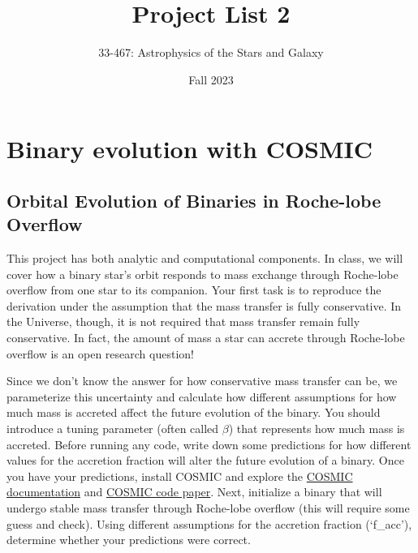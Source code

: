 \documentclass[10pt]{extarticle}
\title{Project List 2}
\author{33-467: Astrophysics of the Stars and Galaxy}
\date{Fall 2023}
\begin{document}
\maketitle


\begin{tcolorbox}[enhanced,
    fonttitle=\fontsize{20}{24}\sffamily\bfseries\selectfont, coltitle=black,
    fontupper=\sffamily, interior style={left color=tcol_CNT1!80,right
    color=tcol_CNT2!80}, frame style={left color=tcol_CNT1!60!black,right
    color=tcol_CNT2!60!black}, attach boxed title to top center={yshift=10pt},
    boxed title style={frame hidden, interior style={left color=tcol_CNT1,right
    color=tcol_CNT2}, frame style={left color=tcol_CNT1!60!black,right
    color=tcol_CNT2!60!black}, height=24pt,bean arc,drop fuzzy shadow },
    top=2mm,bottom=2mm,left=2mm,right=2mm, before skip=20mm,after skip=20mm,
    drop fuzzy shadow,breakable]
%
\makeatletter
{}
\makeatother
\end{tcolorbox}

\section{Binary evolution with COSMIC}

\subsection{Orbital Evolution of Binaries in Roche-lobe Overflow}
This project has both analytic and computational components. In class, we will
cover how a binary star's orbit responds to mass exchange through Roche-lobe
overflow from one star to its companion. Your first task is to reproduce the
derivation under the assumption that the mass transfer is fully conservative. In
the Universe, though, it is not required that mass transfer remain fully
conservative. In fact, the amount of mass a star can accrete through Roche-lobe
overflow is an open research question! 

Since we don't know the answer for how conservative mass transfer can be, we
parameterize this uncertainty and calculate how different assumptions for how
much mass is accreted affect the future evolution of the binary. You should
introduce a tuning parameter (often called $\beta$) that represents how much
mass is accreted. Before running any code, write down some predictions for how
different values for the accretion fraction will alter the future evolution of a
binary. Once you have your predictions, install COSMIC and explore the
\href{https://cosmic-popsynth.github.io/COSMIC/}{COSMIC documentation} and
\href{https://ui.adsabs.harvard.edu/abs/2020ApJ...898...71B/abstract}{COSMIC
code paper}. Next, initialize a binary that will undergo stable mass transfer
through Roche-lobe overflow (this will require some guess and check). Using
different assumptions for the accretion fraction (`f\_acc'), determine whether
your predictions were correct. 
\end{document}
